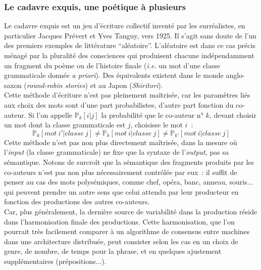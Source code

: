 \documentclass{article}
\begin{document}
			\subsubsection{Le cadavre exquis, une poétique à plusieurs}
				Le cadavre exquis est un jeu d'écriture collectif inventé par les surréalistes, en particulier Jacques Prévert et Yves Tanguy, vers 1925. Il s'agit sans doute de l'un des premiers exemples de littérature ``aléatoire''. L'aléatoire est dans ce cas précis ménagé par la pluralité des consciences qui produisent chacune indépendamment un fragment du poème ou de l'histoire finale (\textit{i.e.} un mot d'une classe grammaticale donnée \textit{a priori}). Des équivalents existent dans le monde anglo-saxon (\textit{round-robin stories}) et au Japon (\textit{Shiritori}).\\
				Cette méthode d'écriture n'est pas pleinement maîtrisée, car les paramètres liés aux choix des mots sont d'une part probabilistes, d'autre part fonction du co-auteur. Si l'on appelle $\mathbb{P}_k[i|j]$ la probabilité que le co-auteur n° $k$, devant choisir un mot dont la classe grammaticale est $j$, choisisse le mot $i$~:
				\begin{equation}
					\mathbb{P}_k[mot \ i' | classe \ j] \neq \mathbb{P}_k[mot \ i | classe \ j] \neq \mathbb{P}_{k'}[mot \ i | classe \ j]
				\end{equation}
				Cette méthode n'est pas non plus directement maîtrisée, dans la mesure où l'\textit{input} (la classe grammaticale) ne fixe que la syntaxe de l'\textit{output}, pas sa sémantique. Notons de surcroît que la sémantique des fragments produits par les co-auteurs n'est pas non plus nécessairement contrôlée par eux~: il suffit de penser au cas des mots polysémiques, comme chef, opéra, banc, anneau, souris... qui peuvent prendre un autre sens que celui attendu par leur producteur en fonction des productions des autres co-auteurs.\\
				
				Car, plus généralement, la dernière source de variabilité dans la production réside dans l'harmonisation finale des productions. Cette harmonisation, que l'on pourrait très facilement comparer à un algorithme de consensus entre machines dans une architecture distribuée, peut consister selon les cas en un choix de genre, de nombre, de temps pour la phrase, et en quelques ajustement supplémentaires (prépositions...).\\
				
\end{document}
